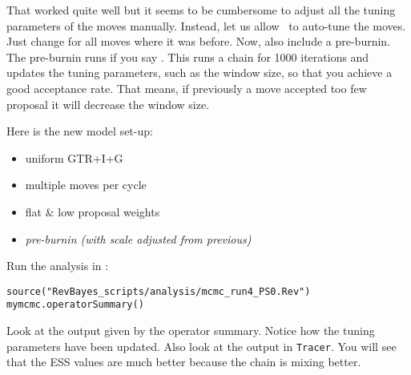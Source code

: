That worked quite well but it seems to be cumbersome to adjust all the tuning parameters of the moves manually.
Instead, let us allow \RevBayes~to auto-tune the moves.
Just change  for all moves where it was  before.
Now, also include a pre-burnin.
The pre-burnin runs if you say .
This runs a chain for 1000 iterations and updates the tuning parameters, such as the window size, so that you achieve a good acceptance rate.
That means, if previously a move accepted too few proposal it will decrease the window size.

Here is the new model set-up:
\begin{itemize}
\item{uniform GTR+I+G}
\item{multiple moves per cycle}
\item{flat \& low proposal weights}
\item{\it pre-burnin (with scale adjusted from previous)}
\end{itemize}
Run the analysis in \RevBayes:
{\tt \begin{snugshade*}
\begin{lstlisting}
source("RevBayes_scripts/analysis/mcmc_run4_PS0.Rev")
mymcmc.operatorSummary()
\end{lstlisting}
\end{snugshade*}}
Look at the output given by the operator summary.
Notice how the tuning parameters have been updated.
Also look at the output in \verb!Tracer!.
You will see that the ESS values are much better because the chain is mixing better.

